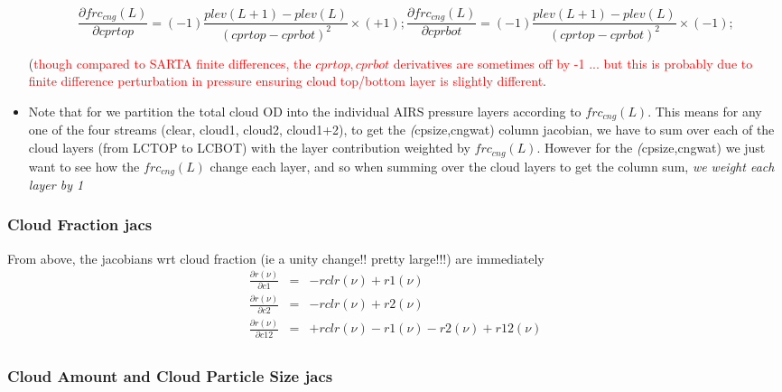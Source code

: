 \documentclass[11pt]{article}
\newcommand{\sa}{\textsf{SARTA}\xspace}
\begin{document}
\begin{itemize}
\[
\frac{\partial frc_{cng}(L)}{\partial cprtop} = (-1) \frac{plev(L+1)-plev(L)}{(cprtop-cprbot)^2} \times (+1);
\frac{\partial frc_{cng}(L)}{\partial cprbot} = (-1) \frac{plev(L+1)-plev(L)}{(cprtop-cprbot)^2} \times (-1);
\]

(\textcolor{red}{though compared to \sa finite differences, the
  $cprtop,cprbot$ derivatives are sometimes off by -1 ... but this is
  probably due to finite difference perturbation in pressure ensuring
  cloud top/bottom layer is slightly different}.

\item Note that for we partition the total cloud OD into the
  individual AIRS pressure layers according to $frc_{cng}(L)$. This
  means for any one of the four streams (clear, cloud1, cloud2,
  cloud1+2), to get the \textit(cpsize,cngwat) column jacobian, we
  have to sum over each of the cloud layers (from LCTOP to LCBOT) with
  the layer contribution weighted by $frc_{cng}(L)$.  However for the
  \textit(cpsize,cngwat) we just want to see how the $frc_{cng}(L)$
  change each layer, and so when summing over the cloud layers to get
  the column sum, \textit{we weight each layer by 1}

\end{itemize}

\subsubsection{Cloud Fraction jacs}
From above, the jacobians wrt cloud fraction (ie a unity change!! pretty large!!!) are immediately
\[
\begin{array}{ccc}
\frac{\partial r(\nu)}{\partial c1} & = & -rclr(\nu) + r1(\nu) \\
\frac{\partial r(\nu)}{\partial c2} & = & -rclr(\nu) + r2(\nu) \\
\frac{\partial r(\nu)}{\partial c12} & = & +rclr(\nu) - r1(\nu) - r2(\nu) + r12(\nu) \\
\end{array}
\]

\subsubsection{Cloud Amount and Cloud Particle Size jacs}
\end{document}
